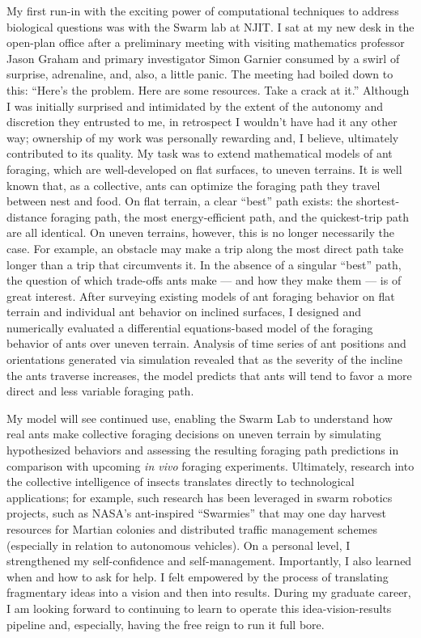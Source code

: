 My first run-in with the exciting power of computational techniques to address biological questions was with the Swarm lab at NJIT.
I sat at my new desk in the open-plan office after a preliminary meeting with visiting mathematics professor Jason Graham and primary investigator Simon Garnier consumed by a swirl of surprise, adrenaline, and, also, a little panic.
The meeting had boiled down to this:
``Here's the problem.
Here are some resources.
Take a crack at it.''
Although I was initially surprised and intimidated by the extent of the autonomy and discretion they entrusted to me, in retrospect I wouldn't have had it any other way;
ownership of my work was personally rewarding and, I believe, ultimately contributed to its quality.
My task was to extend mathematical models of ant foraging, which are well-developed on flat surfaces, to uneven terrains.
It is well known that, as a collective, ants can optimize the foraging path they travel between nest and food.
On flat terrain, a clear ``best'' path exists: the shortest-distance foraging path, the most energy-efficient path, and the quickest-trip path are all identical.
On uneven terrains, however, this is no longer necessarily the case.
For example, an obstacle may make a trip along the most direct path take longer than a trip that circumvents it.
In the absence of a singular ``best'' path, the question of which trade-offs ants make --- and how they make them --- is of great interest.
After surveying existing models of ant foraging behavior on flat terrain and individual ant behavior on inclined surfaces, I designed and numerically evaluated a differential equations-based model of the foraging behavior of ants over uneven terrain.
Analysis of time series of ant positions and orientations generated via simulation revealed that as the severity of the incline the ants traverse increases, the model predicts that ants will tend to favor a more direct and less variable foraging path.

My model will see continued use, enabling the Swarm Lab to understand how real ants make collective foraging decisions on uneven terrain by simulating hypothesized behaviors and assessing the resulting foraging path predictions in comparison with upcoming \textit{in vivo} foraging experiments.
Ultimately, research into the collective intelligence of insects translates directly to technological applications;
for example, such research has been leveraged in swarm robotics projects, such as NASA's ant-inspired ``Swarmies'' that may one day harvest resources for Martian colonies and distributed traffic management schemes (especially in relation to autonomous vehicles).
On a personal level, I strengthened my self-confidence and self-management.
Importantly, I also learned when and how to ask for help.
I felt empowered by the process of translating fragmentary ideas into a vision and then into results.
During my graduate career, I am looking forward to continuing to learn to operate this idea-vision-results pipeline and, especially, having the free reign to run it full bore.

